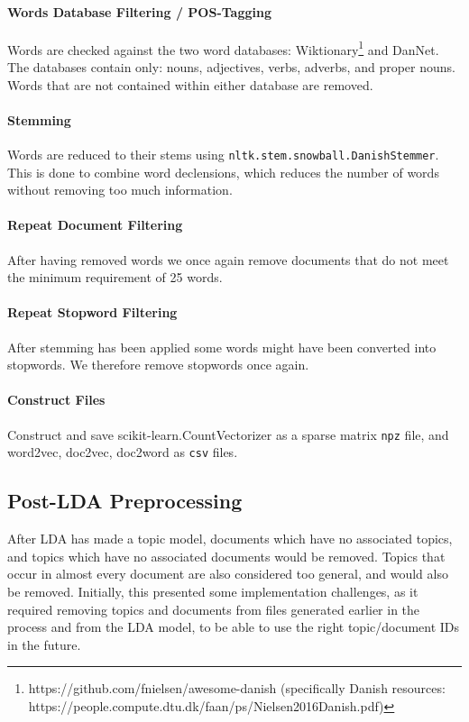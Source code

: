 \paragraph{Words Database Filtering / POS-Tagging}
Words are checked against the two word databases: Wiktionary\footnote{https://github.com/fnielsen/awesome-danish (specifically Danish resources: https://people.compute.dtu.dk/faan/ps/Nielsen2016Danish.pdf)} and DanNet\cite{Pedersen2009DanNetTC}. 
The databases contain only: nouns, adjectives, verbs, adverbs, and proper nouns. 
Words that are not contained within either database are removed.

\paragraph{Stemming}
Words are reduced to their stems using \texttt{nltk.stem.snowball.DanishStemmer}. 
This is done to combine word declensions, which reduces the number of words without removing too much information.

\paragraph{Repeat Document Filtering}
After having removed words we once again remove documents that do not meet the minimum requirement of 25 words.

\paragraph{Repeat Stopword Filtering}
After stemming has been applied some words might have been converted into stopwords.
We therefore remove stopwords once again.


\paragraph{Construct Files}
Construct and save scikit-learn.CountVectorizer as a sparse matrix \texttt{npz} file, and word2vec, doc2vec, doc2word as \texttt{csv} files.

\subsection{Post-LDA Preprocessing}
After LDA has made a topic model, documents which have no associated topics, and topics which have no associated documents would be removed.
Topics that occur in almost every document are also considered too general, and would also be removed. 
Initially, this presented some implementation challenges, as it required removing topics and documents from files generated earlier in the process and from the LDA model, to be able to use the right topic/document IDs in the future.

